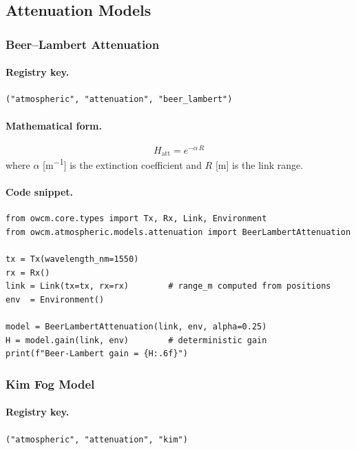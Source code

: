 \documentclass[11pt,a4paper]{article}
\begin{document}
\subsection{Attenuation Models}

\subsubsection{Beer--Lambert Attenuation}
\label{sec:beer_lambert}

\paragraph{Registry key.} \texttt{("atmospheric", "attenuation", "beer\_lambert")}

\paragraph{Mathematical form.}
\begin{equation}
\boxed{H_{\text{att}} = e^{-\alpha \, R}}
\end{equation}
where $\alpha$ [\si{m^{-1}}] is the extinction coefficient and $R$ [m] is the
link range.

\paragraph{Code snippet.}
\begin{lstlisting}
from owcm.core.types import Tx, Rx, Link, Environment
from owcm.atmospheric.models.attenuation import BeerLambertAttenuation

tx = Tx(wavelength_nm=1550)
rx = Rx()
link = Link(tx=tx, rx=rx)        # range_m computed from positions
env  = Environment()

model = BeerLambertAttenuation(link, env, alpha=0.25)
H = model.gain(link, env)        # deterministic gain
print(f"Beer-Lambert gain = {H:.6f}")
\end{lstlisting}

\subsubsection{Kim Fog Model}
\label{sec:kim}

\paragraph{Registry key.} \texttt{("atmospheric", "attenuation", "kim")}
\end{document}
